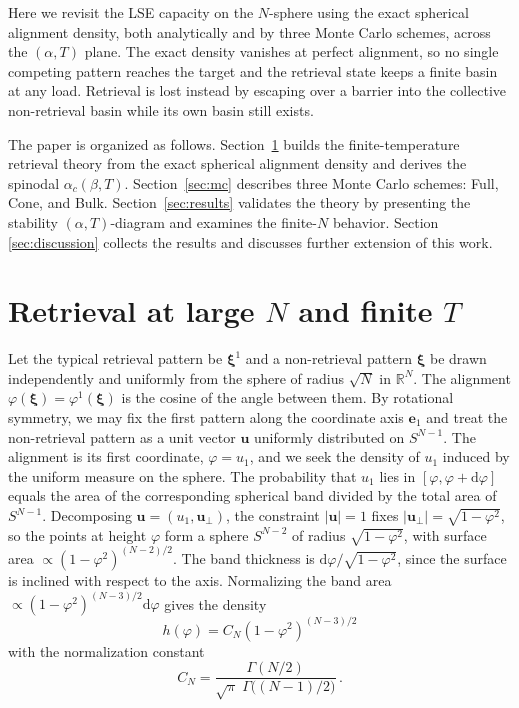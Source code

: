 \documentclass[letterpaper]{article} %
\newcommand{\bxi}{\boldsymbol{\xi}}
\newcommand{\dd}{{\mathrm{d}}}
\newcommand{\Bnet}{\beta}
\begin{document}
Here we revisit the LSE capacity on the $N$-sphere using the exact spherical alignment density, both analytically and by three Monte Carlo schemes, across the $(\alpha, T)$ plane. The exact density vanishes at perfect alignment, so no single competing pattern reaches the target and the retrieval state keeps a finite basin at any load. Retrieval is lost instead by escaping over a barrier into the collective non-retrieval basin while its own basin still exists.

The paper is organized as follows. Section~\ref{sec:theory} builds the
finite-temperature retrieval theory from the exact spherical alignment density and derives the spinodal $\alpha_c(\Bnet, T)$. Section~\ref{sec:mc} describes three
Monte Carlo schemes: Full, Cone, and Bulk. Section~\ref{sec:results} validates the theory by presenting the stability $(\alpha, T)$-diagram and examines the finite-$N$ behavior. Section \ref{sec:discussion} collects the results and discusses further extension of this work.



\section{Retrieval at large $N$ and finite $T$}
\label{sec:theory}

Let the typical retrieval pattern be $\bxi^1$ and a non-retrieval pattern $\bxi$ be drawn independently and uniformly from the sphere of radius $\sqrt N$ in $\mathbb{R}^N$. The alignment $\varphi(\bxi) = \varphi^1(\bxi)$ is the cosine of the angle between them.
By rotational symmetry, we may fix the first pattern along the coordinate axis $\bm e_1$ and treat the non-retrieval pattern as a unit vector $\bm u$ uniformly distributed on $S^{N-1}$. The alignment is its first coordinate, $\varphi=u_1$, and we seek the density of $u_1$ induced by the uniform measure on the sphere. The probability that $u_1$ lies in $[\varphi,\varphi+\dd\varphi]$ equals the area of the corresponding spherical band divided by the total area of $S^{N-1}$. Decomposing $\bm u=(u_1,\bm u_\perp)$, the constraint $|\bm u|=1$ fixes $|\bm u_\perp|=\sqrt{1-\varphi^2}$, so the points at height 
$\varphi$ form a sphere $S^{N-2}$ of radius $\sqrt{1-\varphi^2}$, with surface area $\propto (1-\varphi^2)^{(N-2)/2}$. The band thickness is $\dd\varphi/\sqrt{1-\varphi^2}$, since the surface is inclined with respect to the axis. Normalizing the band area
$\propto(1-\varphi^2)^{(N-3)/2}\dd\varphi$ gives the density
\begin{equation}
h(\varphi)=C_N(1-\varphi^2)^{(N-3)/2}
\label{eq:exact_density}
\end{equation}
with the normalization constant
\begin{equation}
C_N=\frac{\Gamma(N/2)}{\sqrt\pi\;\Gamma\!\big((N-1)/2\big)}\,.
\end{equation}
\end{document}
